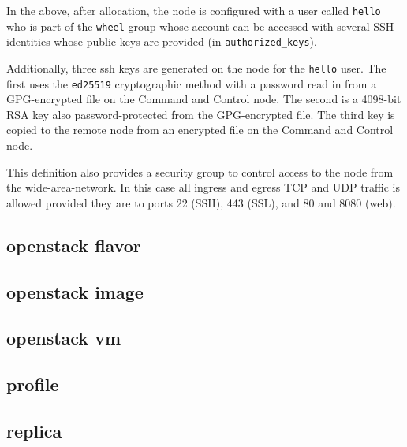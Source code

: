 \documentclass[9pt,twocolumn,twoside]{styles/osajnl}
\begin{document}
In the above, after allocation, the node is configured with a user
called \verb|hello| who is part of the \verb|wheel| group whose
account can be accessed with several SSH identities whose public keys
are provided (in \verb|authorized_keys|).

Additionally, three ssh keys are generated on the node for the
\verb|hello| user. The first uses the \verb|ed25519| cryptographic
method with a password read in from a GPG-encrypted file on the
Command and Control node. The second is a 4098-bit RSA key also
password-protected from the GPG-encrypted file. The third key is
copied to the remote node from an encrypted file on the Command and
Control node.

This definition also provides a security group to control access to
the node from the wide-area-network. In this case all ingress and
egress TCP and UDP traffic is allowed provided they are to ports 22
(SSH), 443 (SSL), and 80 and 8080 (web).



\subsection{openstack flavor}



\subsection{openstack image}



\subsection{openstack vm}


\subsection{profile}



\subsection{replica}
\end{document}
